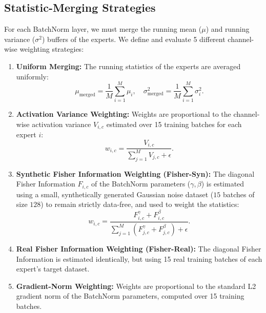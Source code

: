 \documentclass{article}
\theoremstyle{plain}
\theoremstyle{definition}
\theoremstyle{remark}
\begin{document}
\subsection{Statistic-Merging Strategies}
For each BatchNorm layer, we must merge the running mean ($\mu$) and running variance ($\sigma^2$) buffers of the experts. We define and evaluate 5 different channel-wise weighting strategies:
\begin{enumerate}
    \item \textbf{Uniform Merging:} The running statistics of the experts are averaged uniformly:
    \begin{equation}
        \mu_{\text{merged}} = \frac{1}{M} \sum_{i=1}^M \mu_i, \quad \sigma^2_{\text{merged}} = \frac{1}{M} \sum_{i=1}^M \sigma^2_i.
    \end{equation}
    \item \textbf{Activation Variance Weighting:} Weights are proportional to the channel-wise activation variance $V_{i, c}$ estimated over 15 training batches for each expert $i$:
    \begin{equation}
        w_{i, c} = \frac{V_{i, c}}{\sum_{j=1}^M V_{j, c} + \epsilon}.
    \end{equation}
    \item \textbf{Synthetic Fisher Information Weighting (Fisher-Syn):} The diagonal Fisher Information $F_{i, c}$ of the BatchNorm parameters ($\gamma, \beta$) is estimated using a small, synthetically generated Gaussian noise dataset ($15$ batches of size $128$) to remain strictly data-free, and used to weight the statistics:
    \begin{equation}
        w_{i, c} = \frac{F^{\gamma}_{i, c} + F^{\beta}_{i, c}}{\sum_{j=1}^M (F^{\gamma}_{j, c} + F^{\beta}_{j, c}) + \epsilon}.
    \end{equation}
    \item \textbf{Real Fisher Information Weighting (Fisher-Real):} The diagonal Fisher Information is estimated identically, but using 15 real training batches of each expert's target dataset.
    \item \textbf{Gradient-Norm Weighting:} Weights are proportional to the standard L2 gradient norm of the BatchNorm parameters, computed over 15 training batches.
\end{enumerate}
\end{document}
